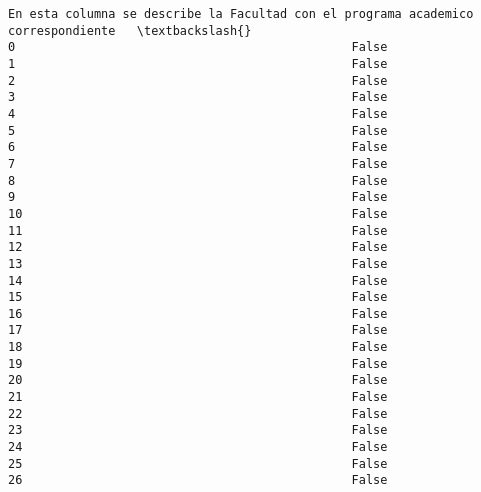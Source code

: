 \documentclass[11pt]{article}
\begin{document}
    \begin{Verbatim}[commandchars=\\\{\}]
    En esta columna se describe la Facultad con el programa academico correspondiente   \textbackslash{}
0                                               False                                    
1                                               False                                    
2                                               False                                    
3                                               False                                    
4                                               False                                    
5                                               False                                    
6                                               False                                    
7                                               False                                    
8                                               False                                    
9                                               False                                    
10                                              False                                    
11                                              False                                    
12                                              False                                    
13                                              False                                    
14                                              False                                    
15                                              False                                    
16                                              False                                    
17                                              False                                    
18                                              False                                    
19                                              False                                    
20                                              False                                    
21                                              False                                    
22                                              False                                    
23                                              False                                    
24                                              False                                    
25                                              False                                    
26                                              False                                    

\end{Verbatim}
\end{document}
